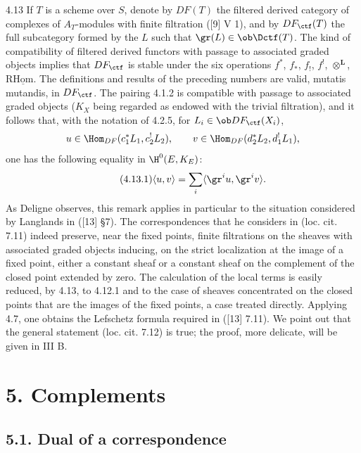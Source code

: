 \begin{statement}{4.13}
If $T$ is a scheme over $S$, denote by $DF(T)$ the filtered derived category of complexes of $A_T$-modules with finite filtration ([9] V 1), and by $DF_{\ctf}(T)$ the full subcategory formed by the $L$ such that $\gr(L)\in\ob\Dctf(T)$. The kind of compatibility of filtered derived functors with passage to associated graded objects implies that $DF_{\ctf}$ is stable under the six operations $f^*$, $f_*$, $f_!$, $f^!$, $\otimes^{\mathbf L}$, $\mathrm{R}\underline{\mathrm{Hom}}$. The definitions and results of the preceding numbers are valid, mutatis mutandis, in $DF_{\ctf}$. The pairing 4.1.2 is compatible with passage to associated graded objects ($K_X$ being regarded as endowed with the trivial filtration), and it follows that, with the notation of 4.2.5, for $L_i\in\ob DF_{\ctf}(X_i)$,
\[
u\in\Hom_{DF}(c_1^*L_1,c_2^!L_2),\qquad
v\in\Hom_{DF}(d_2^*L_2,d_1^!L_1),
\]
one has the following equality in $\H^0(E,K_E)$:
\begin{equation}
\tag{4.13.1}
\langle u,v\rangle=\sum_i\langle \gr^i u,\gr^i v\rangle.
\end{equation}
As Deligne observes, this remark applies in particular to the situation considered by Langlands in ([13] §7). The correspondences that he considers in (loc. cit. 7.11) indeed preserve, near the fixed points, finite filtrations on the sheaves with associated graded objects inducing, on the strict localization at the image of a fixed point, either a constant sheaf or a constant sheaf on the complement of the closed point extended by zero. The calculation of the local terms is easily reduced, by 4.13, to 4.12.1 and to the case of sheaves concentrated on the closed points that are the images of the fixed points, a case treated directly. Applying 4.7, one obtains the Lefschetz formula required in ([13] 7.11). We point out that the general statement (loc. cit. 7.12) is true; the proof, more delicate, will be given in III B.
\end{statement}



\section*{5. Complements}

\subsection*{5.1. Dual of a correspondence}

